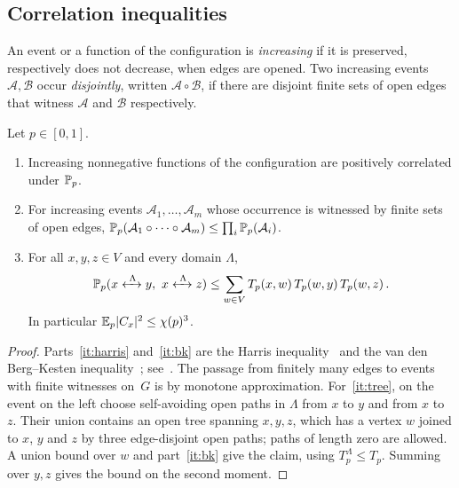 \subsection{Correlation inequalities}\label{sec:correlation}

An event or a function of the configuration is \emph{increasing} if it is preserved, respectively does
not decrease, when edges are opened. Two increasing events $\mathcal A,\mathcal B$ occur
\emph{disjointly}, written $\mathcal A\circ\mathcal B$, if there are disjoint finite sets of open edges
that witness $\mathcal A$ and $\mathcal B$ respectively.

\begin{lemma}\label{lem:correlation}
Let $p\in[0,1]$.
\begin{enumerate}[label=\textup{(\alph*)}]
  \item\label{it:harris} Increasing nonnegative functions of the configuration are positively
  correlated under $\mathbb P_p$.
  \item\label{it:bk} For increasing events $\mathcal A_1,\dots,\mathcal A_m$ whose occurrence is
  witnessed by finite sets of open edges,
  $\mathbb P_p(\mathcal A_1\circ\dots\circ\mathcal A_m)\le\prod_i\mathbb P_p(\mathcal A_i)$.
  \item\label{it:tree} For all $x,y,z\in V$ and every domain $\Lambda$,
  \begin{equation*}
    \PP_p(x\connin{\Lambda}y,\ x\connin{\Lambda}z)\le\sum_{w\in V}T_p(x,w)\,T_p(w,y)\,T_p(w,z)\,.
  \end{equation*}
  In particular $\mathbb E_p\lvert C_x\rvert^2\le\chi(p)^3$.
\end{enumerate}
\end{lemma}

\begin{proof}
Parts~\ref{it:harris} and~\ref{it:bk} are the Harris inequality~\cite{Har60} and the
van den Berg--Kesten inequality~\cite{vdBK85}; see~\cite[Sections~2.2 and~2.3]{Gri99}. The passage from
finitely many edges to events with finite witnesses on~$G$ is by monotone approximation. For~\ref{it:tree},
on the event on the left choose self-avoiding open paths in $\Lambda$ from $x$ to $y$ and from $x$ to~$z$.
Their union contains an open tree spanning $x,y,z$, which has a vertex $w$ joined to $x$, $y$ and $z$ by
three edge-disjoint open paths; paths of length zero are allowed. A union bound over $w$ and
part~\ref{it:bk} give the claim, using $T_p^\Lambda\le T_p$. Summing over $y,z$ gives the bound on the
second moment.
\end{proof}

